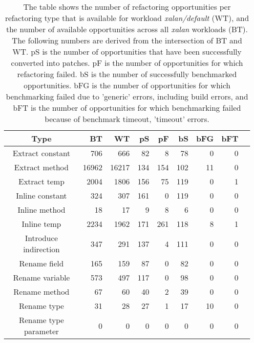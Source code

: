 \begin{table}[!h]
\caption{The table shows the number of refactoring opportunities per refactoring type that is available for workload \textit{xalan/default} (WT), and the number of available opportunities across all \textit{xalan} workloads (BT). The following numbers are derived from the intersection of BT and WT. pS is the number of opportunities that have been successfully converted into patches. pF is the number of opportunities for which refactoring failed. bS is the number of successfully benchmarked opportunities. bFG is the number of opportunities for which benchmarking failed due to 'generic' errors, including build errors, and bFT is the number of opportunities for which benchmarking failed because of benchmark timeout, 'timeout' errors.}
\begin{tabular}{c|*{7}{r}r}
Type&BT&WT&pS&pF&bS&bFG&bFT\\
\hline
Extract constant&706&666&82&8&78&0&0\\
Extract method&16962&16217&134&154&102&11&0\\
Extract temp&2004&1806&156&75&119&0&1\\
Inline constant&324&307&161&0&119&0&0\\
Inline method&18&17&9&8&6&0&0\\
Inline temp&2234&1962&171&261&118&8&1\\
Introduce indirection&347&291&137&4&111&0&0\\
Rename field&165&159&87&0&82&0&0\\
Rename variable&573&497&117&0&98&0&0\\
Rename method&67&60&40&2&39&0&0\\
Rename type&31&28&27&1&17&10&0\\
Rename type parameter&0&0&0&0&0&0&0\\
\end{tabular}
\end{table}

